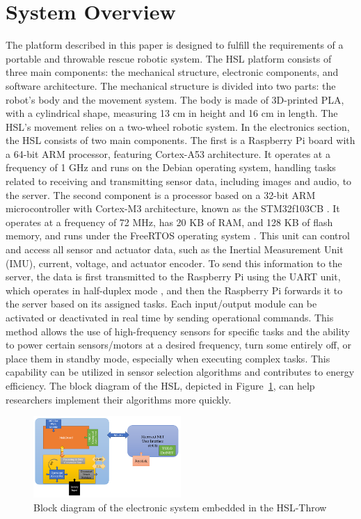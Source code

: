 \documentclass[conference]{IEEEtran}
\begin{document}
\section{System Overview}
The platform described in this paper is designed to fulfill the requirements of a portable and throwable rescue robotic system. The HSL platform consists of three main components: the mechanical structure, electronic components, and software architecture. The mechanical structure is divided into two parts: the robot's body and the movement system. The body is made of 3D-printed PLA, with a cylindrical shape, measuring 13 cm in height and 16 cm in length. The HSL's movement relies on a two-wheel robotic system. In the electronics section, the HSL consists of two main components. The first is a Raspberry Pi board with a 64-bit ARM processor, featuring Cortex-A53 architecture. It operates at a frequency of 1 GHz and runs on the Debian operating system, handling tasks related to receiving and transmitting sensor data, including images and audio, to the server. The second component is a processor based on a 32-bit ARM microcontroller with Cortex-M3 architecture, known as the STM32f103CB \cite{CarmineNoviello2022}. It operates at a frequency of 72 MHz, has 20 KB of RAM, and 128 KB of flash memory, and runs under the FreeRTOS operating system \cite{GUAN201619}. This unit can control and access all sensor and actuator data, such as the Inertial Measurement Unit (IMU), current, voltage, and actuator encoder. To send this information to the server, the data is first transmitted to the Raspberry Pi using the UART unit, which operates in half-duplex mode \cite{teimouri2018mrl}, and then the Raspberry Pi forwards it to the server based on its assigned tasks. Each input/output module can be activated or deactivated in real time by sending operational commands. This method allows the use of high-frequency sensors for specific tasks and the ability to power certain sensors/motors at a desired frequency, turn some entirely off, or place them in standby mode, especially when executing complex tasks. This capability can be utilized in sensor selection algorithms and contributes to energy efficiency. The block diagram of the HSL, depicted in Figure~\ref{Fig_BlockDiagram}, can help researchers implement their algorithms more quickly.

\begin{figure}[htbp] 
    \centerline{\includegraphics[width=0.5\textwidth]{BlockDiagram.PNG}} 
    \caption{Block diagram of the electronic system embedded in the HSL-Throw} 
    \label{Fig_BlockDiagram}
\end{figure}
\end{document}
